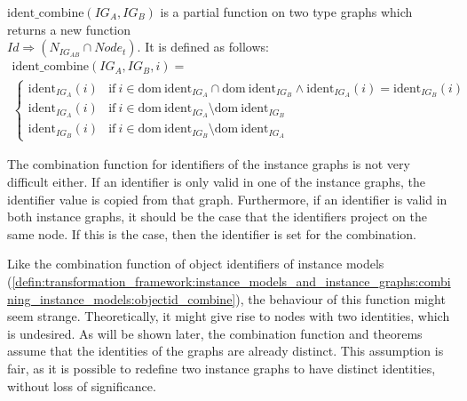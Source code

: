 \begin{defin}
\label{defin:transformation_framework:instance_models_and_instance_graphs:combining_instance_graphs:ident_combine}
$\mathrm{ident\_\!combine}(IG_A, IG_B)$ is a partial function on two type graphs which returns a new function \\$Id \Rightarrow (N_{IG_{AB}} \cap Node_t)$. It is defined as follows:
\begin{multline*}
    \mathrm{ident\_\!combine}(IG_{A}, IG_{B}, i) = \\
    \begin{cases}
        \mathrm{ident}_{IG_A}(i) & \mathrm{if }\ i \in \mathrm{dom}\ \mathrm{ident}_{IG_A} \cap \mathrm{dom}\ \mathrm{ident}_{IG_B} \land \mathrm{ident}_{IG_A}(i) = \mathrm{ident}_{IG_B}(i) \\
        \mathrm{ident}_{IG_A}(i) & \mathrm{if }\ i \in \mathrm{dom}\ \mathrm{ident}_{IG_A} \setminus \mathrm{dom}\ \mathrm{ident}_{IG_B} \\
        \mathrm{ident}_{IG_B}(i) & \mathrm{if }\ i \in \mathrm{dom}\ \mathrm{ident}_{IG_B} \setminus \mathrm{dom}\ \mathrm{ident}_{IG_A}
    \end{cases}
\end{multline*}
\end{defin}

The combination function for identifiers of the instance graphs is not very difficult either. If an identifier is only valid in one of the instance graphs, the identifier value is copied from that graph. Furthermore, if an identifier is valid in both instance graphs, it should be the case that the identifiers project on the same node. If this is the case, then the identifier is set for the combination.

Like the combination function of object identifiers of instance models (\cref{defin:transformation_framework:instance_models_and_instance_graphs:combining_instance_models:objectid_combine}), the behaviour of this function might seem strange. Theoretically, it might give rise to nodes with two identities, which is undesired. As will be shown later, the combination function and theorems assume that the identities of the graphs are already distinct. This assumption is fair, as it is possible to redefine two instance graphs to have distinct identities, without loss of significance.

